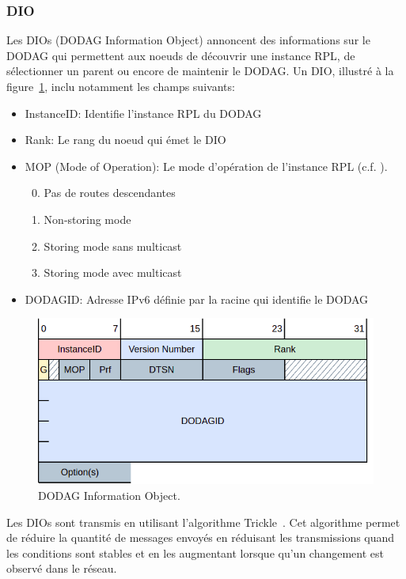 \subsubsection*{DIO}
    Les DIOs (DODAG Information Object) annoncent des informations sur le DODAG qui permettent aux noeuds de découvrir une instance RPL, de sélectionner un parent ou encore de maintenir le DODAG.
    Un DIO, illustré à la figure~\ref{fig:state-dio}, inclu notamment les champs suivants:
    \begin{itemize}
        \item InstanceID: Identifie l'instance RPL du DODAG
        \item Rank: Le rang du noeud qui émet le DIO
        \item MOP (Mode of Operation): Le mode d'opération de l'instance RPL (c.f. ).
        \begin{enumerate}
            \setcounter{enumi}{-1}
            \item Pas de routes descendantes
            \item Non-storing mode
            \item Storing mode sans multicast
            \item Storing mode avec multicast
        \end{enumerate}
        \item DODAGID: Adresse IPv6 définie par la racine qui identifie le DODAG
    \end{itemize}
    \begin{figure}[H]
        \centering
        \includegraphics[scale=0.5]{res/pictures/dio.drawio.png}
        \caption{DODAG Information Object.}
        \label{fig:state-dio}
    \end{figure}

    Les DIOs sont transmis en utilisant l'algorithme Trickle~\cite{rfc:trickle}. Cet algorithme permet de réduire la quantité de messages envoyés en réduisant les transmissions quand les conditions sont stables et en les augmentant lorsque qu'un changement est observé dans le réseau.

